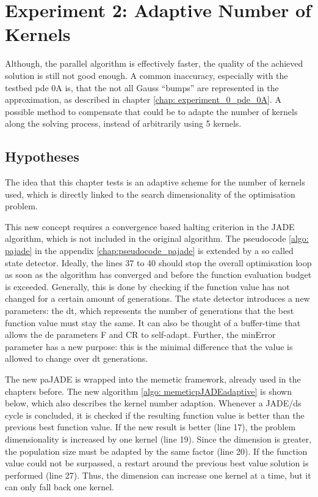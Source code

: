 \documentclass[./\jobname.tex]{subfiles}
\begin{document}
\chapter {Experiment 2: Adaptive Number of Kernels}
\label{chap:experimet_2}

Although, the parallel algorithm is effectively faster, the quality of the achieved solution is still not good enough. A common inaccuracy, especially with the testbed \gls{pde} 0A is, that the not all Gauss ``bumps'' are represented in the approximation, as described in chapter \ref{chap: experiment_0_pde_0A}. A possible method to compensate that could be to adapte the number of kernels along the solving process, instead of arbitrarily using 5 kernels. 

\section{Hypotheses}

The idea that this chapter tests is an adaptive scheme for the number of kernels used, which is directly linked to the search dimensionality of the optimisation problem. 

This new concept requires a convergence based halting criterion in the JADE algorithm, which is not included in the original algorithm. The pseudocode \ref{algo: pajade} in the appendix \ref{chap:pseudocode_pajade} is extended by a so called state detector. Ideally, the lines 37 to 40 should stop the overall optimisation loop as soon as the algorithm has converged and before the function evaluation budget is exceeded. Generally, this is done by checking if the function value has not changed for a certain amount of generations. The state detector introduces a new parameters: the \gls{dt}, which represents the number of generations that the best function value must stay the same. It can also be thought of a buffer-time that allows the \gls{de} parameters F and CR to self-adapt. Further, the minError parameter has a new purpose: this is the minimal difference that the value is allowed to change over \gls{dt} generations. 

The new paJADE is wrapped into the memetic framework, already used in the chapters before. The new algorithm \ref{algo: memeticpJADEadaptive} is shown below, which also describes the kernel number adaption. Whenever a JADE/\gls{ds} cycle is concluded, it is checked if the resulting function value is better than the previous best function value. If the new result is better (line 17), the problem dimensionality is increased by one kernel (line 19). Since the dimension is greater, the population size must be adapted by the same factor (line 20). If the function value could not be surpassed, a restart around the previous best value solution is performed (line 27). Thus, the dimension can increase one kernel at a time, but it can only fall back one kernel. 
\end{document}
